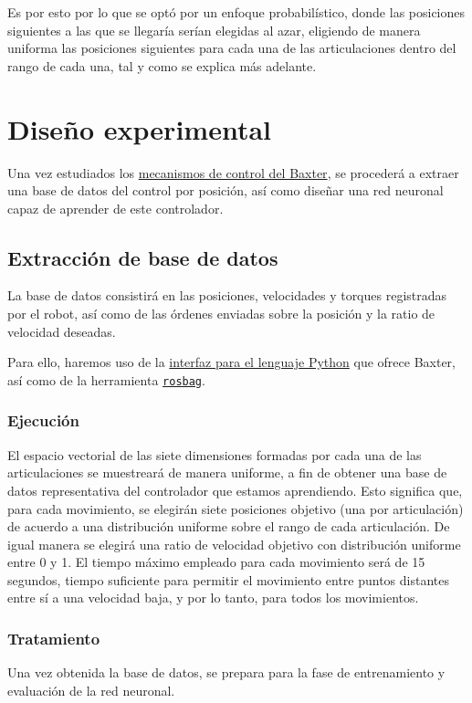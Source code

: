 Es por esto por lo que se optó por un enfoque probabilístico, donde las posiciones siguientes a las que se llegaría serían elegidas al azar, eligiendo de manera uniforma las posiciones siguientes para cada una de las articulaciones dentro del rango de cada una, tal y como se explica más adelante.

\section{Diseño experimental}
Una vez estudiados los \hyperref[subsec:metodos/control_baxter]{mecanismos de control del Baxter}, se procederá a extraer una base de datos del control por posición, así como diseñar una red neuronal capaz de aprender de este controlador.

\subsection{Extracción de base de datos}
La base de datos consistirá en las posiciones, velocidades y torques registradas por el robot, así como de las órdenes enviadas sobre la posición y la ratio de velocidad deseadas.

Para ello, haremos uso de la \hyperref[subsubsec:metodos/pythonAPI]{interfaz para el lenguaje Python} que ofrece Baxter, así como de la herramienta \hyperref[subsec:metodos/rosbag]{\texttt{rosbag}}.
\subsubsection{Ejecución}
El espacio vectorial de las siete dimensiones formadas por cada una de las articulaciones se muestreará de manera uniforme, a fin de obtener una base de datos representativa del controlador que estamos aprendiendo. Esto significa que, para cada movimiento, se elegirán siete posiciones objetivo (una por articulación) de acuerdo a una distribución uniforme sobre el rango de cada articulación. De igual manera se elegirá una ratio de velocidad objetivo con distribución uniforme entre 0 y 1. El tiempo máximo empleado para cada movimiento será de 15 segundos, tiempo suficiente para permitir el movimiento entre puntos distantes entre sí a una velocidad baja, y por lo tanto, para todos los movimientos.

\subsubsection{Tratamiento}
Una vez obtenida la base de datos, se prepara para la fase de entrenamiento y evaluación de la red neuronal.

